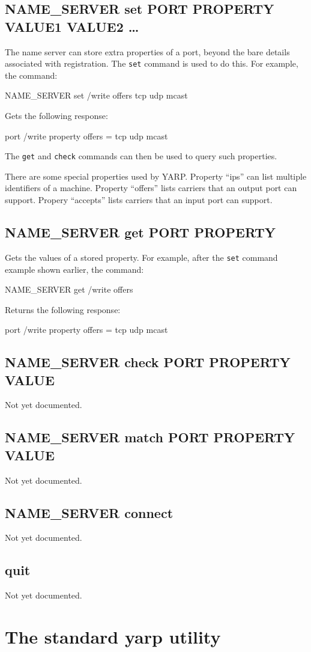 \documentclass[a4]{article}
\newenvironment{codecase}[1]{\subsection{#1}}{}
\begin{document}
\begin{codecase}{NAME\_SERVER set PORT PROPERTY VALUE1 VALUE2 \ldots}

The name server can store extra properties of a port, beyond the
bare details associated with registration.  The {\tt set} command
is used to do this.  For example, the command:
\begin{code}
NAME_SERVER set /write offers tcp udp mcast
\end{code}
Gets the following response:
\begin{code}
port /write property offers = tcp udp mcast
\end{code}
The {\tt get} and {\tt check} commands can then be used to query
such properties.

There are some special properties used by YARP.  Property ``ips''
can list multiple identifiers of a machine.  Property ``offers''
lists carriers that an output port can support.  Propery ``accepts''
lists carriers that an input port can support.

\end{codecase}

\begin{codecase}{NAME\_SERVER get PORT PROPERTY}
Gets the values of a stored property. For example, 
after the {\tt set} command example shown earlier, the command:
\begin{code}
NAME_SERVER get /write offers
\end{code}
Returns the following response:
\begin{code}
port /write property offers = tcp udp mcast
\end{code}
\end{codecase}

\begin{codecase}{NAME\_SERVER check PORT PROPERTY VALUE}
Not yet documented.
\end{codecase}

\begin{codecase}{NAME\_SERVER match PORT PROPERTY VALUE}
Not yet documented.
\end{codecase}

\begin{codecase}{NAME\_SERVER connect}
Not yet documented.
\end{codecase}

\begin{codecase}{quit}
Not yet documented.
\end{codecase}


\section{The standard yarp utility}
\end{document}
